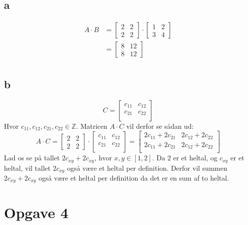 \documentclass[a4paper,10pt]{article}
\newcommand{\Z}{\mathbb{Z}}
\begin{document}
\subsection{a}
\begin{align*}
    A \cdot B &= 
\begin{bmatrix}
    2 & 2 \\
    2 & 2 
\end{bmatrix}
\cdot
\begin{bmatrix}
    1 & 2 \\
    3 & 4 
\end{bmatrix} \\
&= 
\begin{bmatrix}
    8 & 12 \\
    8 & 12 
\end{bmatrix} \\
\end{align*}

\subsection{b}
\[
    C = 
    \begin{bmatrix}
        c_{11} & c_{12} \\
        c_{21} & c_{22} \\
    \end{bmatrix}
\]
Hvor $c_{11}, c_{12}, c_{21}, c_{22} \in \Z$.
Matricen $A \cdot C$ vil derfor se sådan ud:
\[
    A \cdot C = 
    \begin{bmatrix}
        2 & 2 \\
        2 & 2 
    \end{bmatrix}
    \cdot
    \begin{bmatrix}
        c_{11} & c_{12} \\
        c_{21} & c_{22} \\
    \end{bmatrix}
    =
    \begin{bmatrix}
        2c_{11} + 2c_{21} & 2c_{12} + 2c_{22} \\
        2c_{11} + 2c_{21} & 2c_{12} + 2c_{22} \\
    \end{bmatrix}
\]
Lad os se på tallet $2c_{xy} + 2c_{xy}$, hvor $x, y \in [1,2]$. 
Da $2$ er et heltal, og $c_{xy}$ er et heltal, vil tallet $2c_{xy}$ også være
et heltal per definition. Derfor vil summen $2c_{xy} + 2c_{xy}$ også være et
heltal per definition da det er en sum af to heltal.

\section{Opgave 4}
\end{document}
